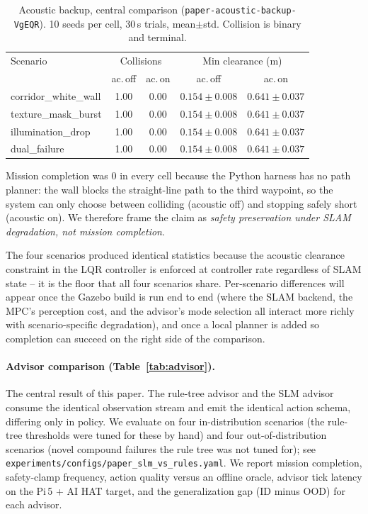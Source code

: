 \begin{table}[t]
\caption{Acoustic backup, central comparison
(\texttt{paper-acoustic-backup-VgEQR}). 10 seeds per cell, 30\,s
trials, mean$\pm$std. Collision is binary and terminal.}
\label{tab:acoustic}
\centering
\begin{tabular}{lcccc}
\hline
Scenario & \multicolumn{2}{c}{Collisions} & \multicolumn{2}{c}{Min clearance (m)} \\
         & ac.\,off & ac.\,on & ac.\,off & ac.\,on \\
\hline
corridor\_white\_wall   & 1.00 & 0.00 & $0.154 \pm 0.008$ & $0.641 \pm 0.037$ \\
texture\_mask\_burst    & 1.00 & 0.00 & $0.154 \pm 0.008$ & $0.641 \pm 0.037$ \\
illumination\_drop      & 1.00 & 0.00 & $0.154 \pm 0.008$ & $0.641 \pm 0.037$ \\
dual\_failure           & 1.00 & 0.00 & $0.154 \pm 0.008$ & $0.641 \pm 0.037$ \\
\hline
\end{tabular}
\end{table}

Mission completion was $0$ in every cell because the Python
harness has no path planner: the wall blocks the straight-line
path to the third waypoint, so the system can only choose between
colliding (acoustic off) and stopping safely short (acoustic on).
We therefore frame the claim as \emph{safety preservation under
SLAM degradation, not mission completion}.

The four scenarios produced identical statistics because the
acoustic clearance constraint in the LQR controller is enforced
at controller rate regardless of SLAM state -- it is the floor
that all four scenarios share. Per-scenario differences will
appear once the Gazebo build is run end to end (where the SLAM
backend, the MPC's perception cost, and the advisor's mode
selection all interact more richly with scenario-specific
degradation), and once a local planner is added so completion
can succeed on the right side of the comparison.

\paragraph{Advisor comparison (Table~\ref{tab:advisor}).}
The central result of this paper. The rule-tree advisor and the
SLM advisor consume the identical observation stream and emit the
identical action schema, differing only in policy. We evaluate on
four in-distribution scenarios (the rule-tree thresholds were
tuned for these by hand) and four out-of-distribution scenarios
(novel compound failures the rule tree was not tuned for); see
\texttt{experiments/configs/paper\_slm\_vs\_rules.yaml}. We report
mission completion, safety-clamp frequency, action quality versus
an offline oracle, advisor tick latency on the Pi\,5 + AI HAT
target, and the generalization gap (ID minus OOD) for each
advisor.

